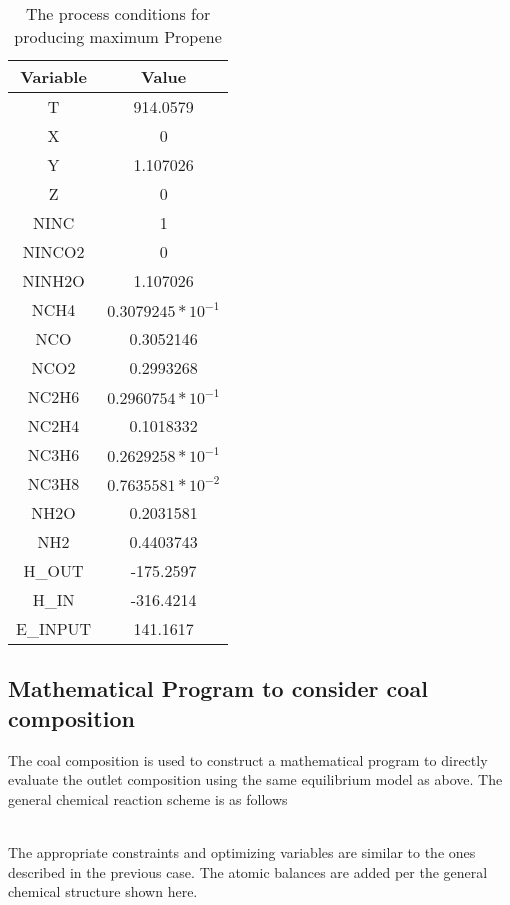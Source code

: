 \documentclass[journal=iecred,manuscript=article]{achemso}
\begin{document}
\FloatBarrier
\begin{table}[H]
\caption{The process conditions for producing maximum Propene} 
\centering
\begin{tabular}{|c|c|}
\hline\hline %
Variable & Value \\ 
[1ex] %
\hline %
T	&  914.0579  \\
\hline
X	 & 0 \\
\hline
Y	& 1.107026  \\
\hline
Z	&  0 \\
\hline
NINC	& 1 \\
\hline
NINCO2	& 0 \\
\hline
NINH2O	&  1.107026  \\
\hline
NCH4 &	 $0.3079245*10^{-1}$ \\
\hline
NCO	& 0.3052146  \\
\hline
NCO2	& 0.2993268  \\
\hline
NC2H6	& $0.2960754*10^{-1}$ \\
\hline
NC2H4	& 0.1018332   \\
\hline
NC3H6	& $0.2629258*10^{-1}$ \\
\hline
NC3H8	& $0.7635581*10^{-2}$ \\
\hline
NH2O	&  0.2031581     \\
\hline
NH2 & 0.4403743  \\
\hline
H_{OUT}	& -175.2597    \\
\hline
H_{IN}	& -316.4214   \\
\hline
E_{INPUT}	& 141.1617   \\
\hline 
\end{tabular}
\end{table}
\FloatBarrier

\subsection{Mathematical Program to consider coal composition}
The coal composition is used to construct a mathematical program to directly evaluate the outlet composition using the same equilibrium model as above. The general chemical reaction scheme is as follows

\begin{scheme} 
\end{scheme} 
\\
The appropriate constraints and optimizing variables are similar to the ones described in the previous case. The atomic balances are added per the general chemical structure shown here.\\
\end{document}
